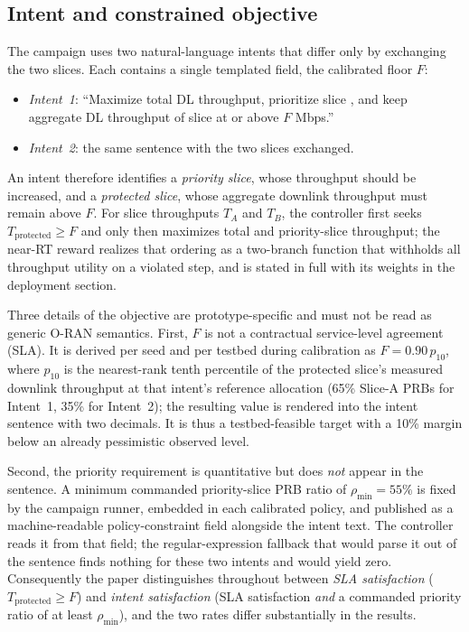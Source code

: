 \subsection{Intent and constrained objective}
\label{subsec:objective}
The campaign uses two natural-language intents that differ only by exchanging the two slices. Each contains a single templated field, the calibrated floor $F$:
\begin{itemize}
  \item \emph{Intent~1}: ``Maximize total DL throughput, prioritize slice \snssaiA, and keep aggregate DL throughput of slice \snssaiB{} at or above $F$ Mbps.''
  \item \emph{Intent~2}: the same sentence with the two slices exchanged.
\end{itemize}
An intent therefore identifies a \emph{priority slice}, whose throughput should be increased, and a \emph{protected slice}, whose aggregate downlink throughput must remain above $F$. For slice throughputs $T_A$ and $T_B$, the controller first seeks $T_{\mathrm{protected}}\geq F$ and only then maximizes total and priority-slice throughput; the near-RT reward realizes that ordering as a two-branch function that withholds all throughput utility on a violated step, and is stated in full with its weights in the deployment section.

Three details of the objective are prototype-specific and must not be read as generic O-RAN semantics. First, $F$ is not a contractual service-level agreement (SLA). It is derived per seed and per testbed during calibration as $F=0.90\,p_{10}$, where $p_{10}$ is the nearest-rank tenth percentile of the protected slice's measured downlink throughput at that intent's reference allocation (65\% Slice-A PRBs for Intent~1, 35\% for Intent~2); the resulting value is rendered into the intent sentence with two decimals. It is thus a testbed-feasible target with a 10\% margin below an already pessimistic observed level.

Second, the priority requirement is quantitative but does \emph{not} appear in the sentence. A minimum commanded priority-slice PRB ratio of $\rho_{\min}=55\%$ is fixed by the campaign runner, embedded in each calibrated policy, and published as a machine-readable policy-constraint field alongside the intent text. The controller reads it from that field; the regular-expression fallback that would parse it out of the sentence finds nothing for these two intents and would yield zero. Consequently the paper distinguishes throughout between \emph{SLA satisfaction} ($T_{\mathrm{protected}}\geq F$) and \emph{intent satisfaction} (SLA satisfaction \emph{and} a commanded priority ratio of at least $\rho_{\min}$), and the two rates differ substantially in the results.


